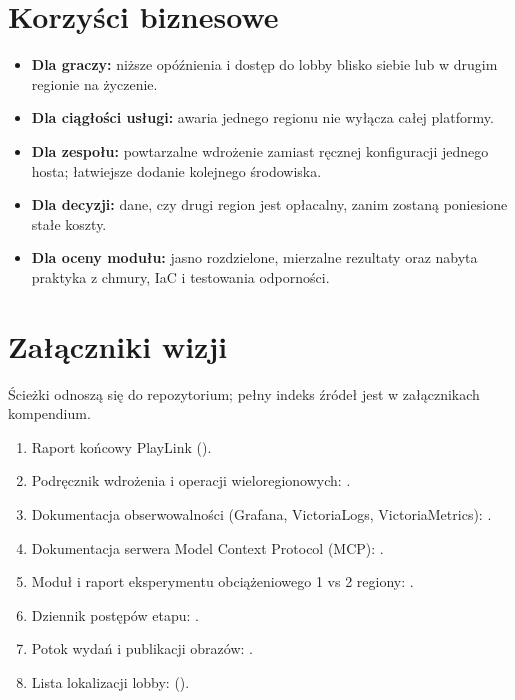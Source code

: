 \section{Korzyści biznesowe}
\begin{itemize}
  \item \textbf{Dla graczy:} niższe opóźnienia i dostęp do lobby blisko siebie lub
        w drugim regionie na życzenie.
  \item \textbf{Dla ciągłości usługi:} awaria jednego regionu nie wyłącza całej
        platformy.
  \item \textbf{Dla zespołu:} powtarzalne wdrożenie zamiast ręcznej konfiguracji
        jednego hosta; łatwiejsze dodanie kolejnego środowiska.
  \item \textbf{Dla decyzji:} dane, czy drugi region jest opłacalny, zanim zostaną
        poniesione stałe koszty.
  \item \textbf{Dla oceny modułu:} jasno rozdzielone, mierzalne rezultaty oraz
        nabyta praktyka z chmury, IaC i testowania odporności.
\end{itemize}

\section{Załączniki wizji}
Ścieżki odnoszą się do repozytorium; pełny indeks źródeł jest w załącznikach kompendium.
\begin{enumerate}[label=Z\arabic*.]
  \item Raport końcowy PlayLink ().
  \item Podręcznik wdrożenia i operacji wieloregionowych: .
  \item Dokumentacja obserwowalności (Grafana, VictoriaLogs, VictoriaMetrics): .
  \item Dokumentacja serwera Model Context Protocol (MCP): .
  \item Moduł i raport eksperymentu obciążeniowego 1 vs 2 regiony: .
  \item Dziennik postępów etapu: .
  \item Potok wydań i publikacji obrazów: .
  \item Lista lokalizacji lobby:  ().
\end{enumerate}

